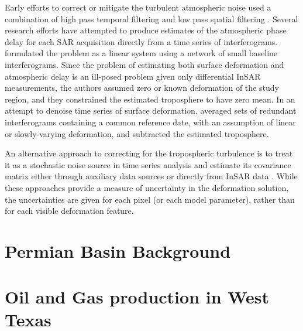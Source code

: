 \documentclass{utexasthesis}
\begin{document}
Early efforts to correct or mitigate the turbulent atmospheric noise used a combination of high pass temporal filtering and low pass spatial filtering \cite{Ferretti2001PermanentScatterersSar, Berardino2002NewAlgorithmSurface}.
Several research efforts have attempted to produce estimates of the atmospheric phase delay for each SAR acquisition directly from a time series of interferograms. \cite{Liu2012SatelliteRadarInterferometry} formulated the problem as a linear system using a network of small baseline interferograms. Since the problem of estimating both surface deformation and atmospheric delay is an ill-posed problem given only differential InSAR measurements, the authors assumed zero or known deformation of the study region, and they constrained the estimated troposphere to have zero mean. In an attempt to denoise time series of surface deformation, \cite{Tymofyeyeva2015MitigationAtmosphericPhase} averaged sets of redundant interferograms containing a common reference date, with an assumption of linear or slowly-varying deformation, and subtracted the estimated troposphere.

An alternative approach to correcting for the tropospheric turbulence is to treat it as a stochastic noise source in time series analysis \cite{Simons2007InterferometricSyntheticAperture, Agram2015NoiseModelInsar} and estimate its covariance matrix either through auxiliary data sources \cite{Barnhart2013CharacterizingEstimatingNoise, Parker2015SystematicAssessmentAtmospheric} or directly from InSAR data \cite{Lohman2005SomeThoughtsUse}. While these approaches provide a measure of uncertainty in the deformation solution, the uncertainties are given for each pixel (or each model parameter), rather than for each visible deformation feature.


\chapter{Permian Basin Background}


\chapter{Oil and Gas production in West Texas}
\end{document}
